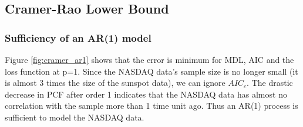\subsection{Cramer-Rao Lower Bound} %

\subsubsection{Sufficiency of an AR(1) model}

Figure \ref{fig:cramer_ar1} shows that the error is minimum for MDL, AIC and the loss function at p=1. Since the NASDAQ data's sample size is no longer small (it is almost 3 times the size of the sunspot data), we can ignore $AIC_c$. The drastic decrease in PCF after order 1 indicates that the NASDAQ data has almost no correlation with the sample more than 1 time unit ago. Thus an AR(1) process is sufficient to model the NASDAQ data.

